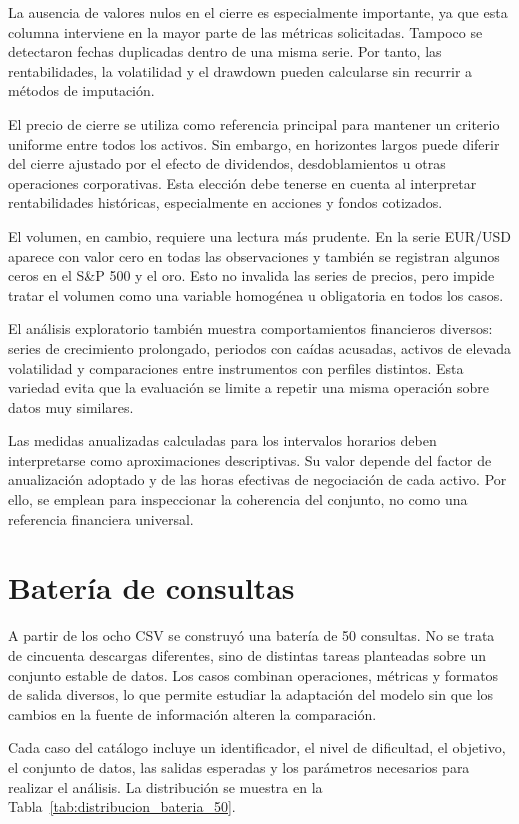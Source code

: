 La ausencia de valores nulos en el cierre es especialmente importante, ya que esta columna interviene en la mayor parte de las métricas solicitadas. Tampoco se detectaron fechas duplicadas dentro de una misma serie. Por tanto, las rentabilidades, la volatilidad y el drawdown pueden calcularse sin recurrir a métodos de imputación.

El precio de cierre se utiliza como referencia principal para mantener un criterio uniforme entre todos los activos. Sin embargo, en horizontes largos puede diferir del cierre ajustado por el efecto de dividendos, desdoblamientos u otras operaciones corporativas. Esta elección debe tenerse en cuenta al interpretar rentabilidades históricas, especialmente en acciones y fondos cotizados.

El volumen, en cambio, requiere una lectura más prudente. En la serie EUR/USD aparece con valor cero en todas las observaciones y también se registran algunos ceros en el S\&P 500 y el oro. Esto no invalida las series de precios, pero impide tratar el volumen como una variable homogénea u obligatoria en todos los casos.

El análisis exploratorio también muestra comportamientos financieros diversos: series de crecimiento prolongado, periodos con caídas acusadas, activos de elevada volatilidad y comparaciones entre instrumentos con perfiles distintos. Esta variedad evita que la evaluación se limite a repetir una misma operación sobre datos muy similares.

Las medidas anualizadas calculadas para los intervalos horarios deben interpretarse como aproximaciones descriptivas. Su valor depende del factor de anualización adoptado y de las horas efectivas de negociación de cada activo. Por ello, se emplean para inspeccionar la coherencia del conjunto, no como una referencia financiera universal.

\section{Batería de consultas}

A partir de los ocho CSV se construyó una batería de 50 consultas. No se trata de cincuenta descargas diferentes, sino de distintas tareas planteadas sobre un conjunto estable de datos. Los casos combinan operaciones, métricas y formatos de salida diversos, lo que permite estudiar la adaptación del modelo sin que los cambios en la fuente de información alteren la comparación.

Cada caso del catálogo incluye un identificador, el nivel de dificultad, el objetivo, el conjunto de datos, las salidas esperadas y los parámetros necesarios para realizar el análisis. La distribución se muestra en la Tabla~\ref{tab:distribucion_bateria_50}.

